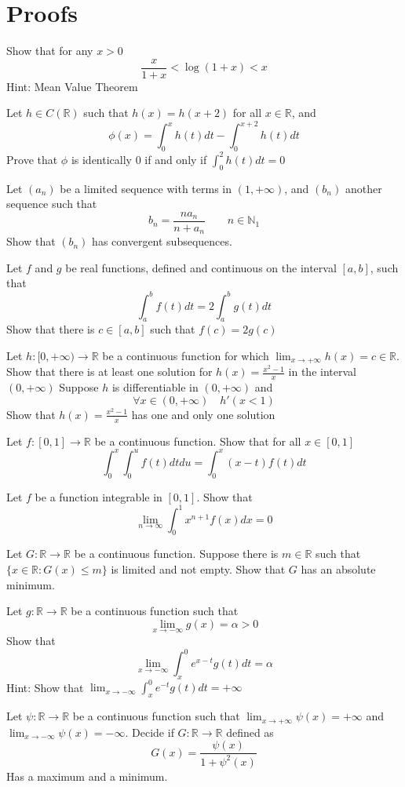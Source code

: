\documentclass[12pt]{article}
\begin{document}
\section{Proofs}
\begin{ExerciseList}
	\Exercise Show that for any $x>0$
	$$\frac{x}{1+x} < \log(1+x) < x$$
	Hint: Mean Value Theorem

	\Exercise Let $h\in C(\mathbb R)$ such that $h(x) = h(x+2)$ for all $x\in\mathbb R$, and
	$$\phi(x) = \int_0^x{h(t)dt}-\int_0^{x+2}{h(t)dt}$$
	Prove that $\phi$ is identically $0$ if and only if $\int_0^2 h(t)dt = 0$

	\Exercise Let $(a_n)$ be a limited sequence with terms in $(1,+\infty)$, and
	$(b_n)$ another sequence such that $$b_n = \frac{na_n}{n+a_n}\qquad n\in\mathbb N_1$$
	Show that $(b_n)$ has convergent subsequences.

	\Exercise Let $f$ and $g$ be real functions, defined and continuous on the interval $[a,b]$, such that
	$$\int_a^b{f(t)}dt = 2\int_a^b{g(t)}dt$$
	Show that there is $c\in[a,b]$ such that $f(c)=2g(c)$

	\Exercise Let $h\colon [0,+\infty)\to\mathbb R$ be a continuous function
	for which $\lim_{x\to +\infty}h(x)=c\in\mathbb R$.
	\Question Show that there is at least one solution for $h(x)=\frac{x^2-1}{x}$
	in the interval $(0,+\infty)$
	\Question Suppose $h$ is differentiable in $(0,+\infty)$ and
	$$\forall x\in(0,+\infty)\quad h'(x<1)$$
	Show that $h(x)=\frac{x^2-1}{x}$ has one and only one solution

	\Exercise Let $f\colon [0,1]\to\mathbb R$ be a continuous function. Show that
	for all $x\in[0,1]$
	$$\int_0^x{\int_0^u{f(t)}dt}du=\int_0^x{(x-t)f(t)}dt$$

	\Exercise Let $f$ be a function integrable in $[0,1]$. Show that
	$$\lim_{n\to\infty}\int_0^1{x^{n+1}f(x)}dx = 0$$

	\Exercise Let $G\colon \mathbb R\to \mathbb R$ be a continuous function.
	Suppose there is $m\in\mathbb R$ such that $\{ x\in\mathbb R\colon G(x)\le m \}$
	is limited and not empty.
	Show that $G$ has an absolute minimum.

	\Exercise Let $g\colon \mathbb R \to \mathbb R$ be a continuous function such that
	$$\lim_{x\to -\infty}g(x)=\alpha>0$$
	Show that
	$$\lim_{x\to -\infty}\int_x^0 e^{x-t}g(t)dt=\alpha$$
	Hint: Show that $\lim_{x\to -\infty}\int_x^0 e^{-t}g(t)dt=+\infty$

	\Exercise Let $\psi\colon\mathbb R \to \mathbb R$ be a continuous function
	such that $\lim_{x\to +\infty}\psi(x)=+\infty$ and $\lim_{x\to -\infty}\psi(x)=-\infty$.
	Decide if $G\colon\mathbb R \to \mathbb R$ defined as
	$$G(x)=\frac{\psi(x)}{1+\psi^2(x)}$$
	Has a maximum and a minimum.


\end{ExerciseList}
\end{document}
